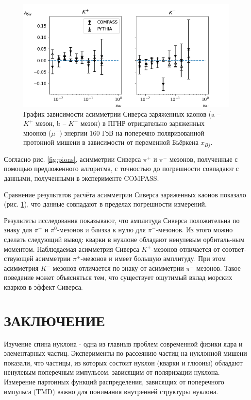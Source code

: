 \documentclass{extreport}
\begin{document}
\begin{figure}[h]
	\centering
	\includegraphics[width=\linewidth]{ASivK.png}
	\caption{График зависимости асимметрии Сиверса заряженных каонов (a -- $K^+$ мезон, b -- $K^-$ мезон) в ПГНР отрицательно заряженных мюонов ($\mu^-$) энергии 160 ГэВ на поперечно поляризованной протонной мишени в зависимости от переменной Бьёркена $x_{Bj}$. }
	\label{fig:kaons}
\end{figure}
Согласно рис. \ref{fig:pions}, асимметрии Сиверса $\pi^{+}$ и $\pi^{-}$ мезонов, полученные с помощью предложенного алгоритма, с точностью до погрешности совпадают с данными, полученными в эксперименте COMPASS.  

Сравнение результатов расчёта асимметрии Сиверса заряженных каонов показало (рис. \ref{fig:kaons}), что данные совпадают в пределах погрешности измерений.

Результаты исследования показывают, что амплитуда Сиверса положительна по знаку для $\pi^{+}$ и $\pi^0$-мезонов и близка к нулю для $\pi^{-}$-мезонов. Из этого можно сделать следующий вывод: кварки в нуклоне обладают ненулевым орбиталь-ным моментом. 
Наблюдаемая асимметрия Сиверса $K^{+}$-мезонов отличается от соответ-ствующей асимметрии $\pi^{+}$-мезонов и имеет большую амплитуду. При этом асимметрия $K^{-}$-мезонов отличается по знаку от асимметрии $\pi^{-}$-мезонов. Такое поведение может объясняться тем, что существует ощутимый вклад морских кварков в эффект Сиверса. 


\newpage
\chapter*{\MakeUppercase{Заключение}}
\thispagestyle{headings}
Изучение спина нуклона - одна из главныв проблем современной физики ядра и элементарных частиц. Эксперименты по рассеянию частиц на нуклонной мишени показали, что частицы, из которых состоит нуклон (кварки и глюоны) обладают ненулевым поперечным импульсом, зависящим от поляризации нуклона. Измерение партонных функций распределения, зависящих от поперечного импульса (TMD) важно для понимания внутренней структуры нуклона.
\end{document}
